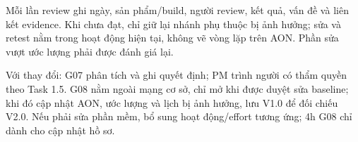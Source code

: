 \noindent Mỗi lần review ghi ngày, sản phẩm/build, người review, kết quả, vấn đề và liên kết evidence. Khi chưa đạt, chỉ giữ lại nhánh phụ thuộc bị ảnh hưởng; sửa và retest nằm trong hoạt động hiện tại, không vẽ vòng lặp trên AON. Phần sửa vượt ước lượng phải được đánh giá lại.

\medskip
\noindent Với thay đổi: G07 phân tích và ghi quyết định; PM trình người có thẩm quyền theo Task 1.5. G08 nằm ngoài mạng cơ sở, chỉ mở khi được duyệt sửa baseline; khi đó cập nhật AON, ước lượng và lịch bị ảnh hưởng, lưu V1.0 để đối chiếu V2.0. Nếu phải sửa phần mềm, bổ sung hoạt động/effort tương ứng; 4h G08 chỉ dành cho cập nhật hồ sơ.
